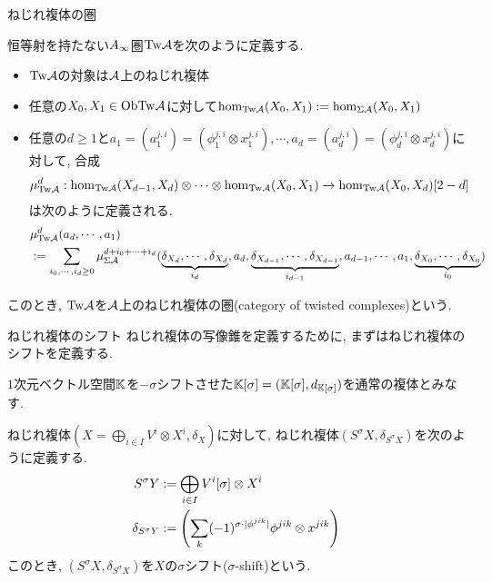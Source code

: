 \documentclass[aspectratio=169, dvipdfmx, 8pt, notheorems, uplatex]{beamer}
\begin{document}
\begin{frame}{ねじれ複体の圏}
  \begin{definition}[ねじれ複体の圏$\Tw\A$]
    恒等射を持たない$A_\infty$圏$\Tw\A$を次のように定義する.
    \begin{itemize}
      \item $\Tw\A$の対象は$\mathcal{A}$上のねじれ複体
      \item 任意の$X_0,X_1 \in \mathrm{Ob}\mathrm{Tw}\mathcal{A}$に対して$\hom_{\mathrm{Tw}\mathcal{A}}(X_0,X_1) : = \hom_{\Sigma\mathcal{A}}(X_0,X_1)$
      \item 任意の$d \geq 1$と$a_1 = (a_1^{j,i}) = (\phi_1^{j,i} \otimes x_1^{j,i}), \cdots, a_d = (a_d^{j,i}) = (\phi_d^{j,i} \otimes x_d^{j,i})$に対して, 合成
      \begin{align*}
        \mu^d_{\mathrm{Tw}\mathcal{A}} : \hom_{\mathrm{Tw}\mathcal{A}}(X_{d-1},X_d) \otimes \cdots \otimes \hom_{\mathrm{Tw}\mathcal{A}}(X_0,X_1) \to \hom_{\mathrm{Tw}\mathcal{A}}(X_0,X_d)[2-d]
      \end{align*}
      は次のように定義される. 
      \begin{align*}
        &\mu^d_{\mathrm{Tw}\mathcal{A}}(a_d,\cdots,a_1) \\
        &:= \sum_{i_0,\cdots,i_d \geq 0} \mu^{d+i_0+\cdots+i_d}_{\Sigma\mathcal{A}} (
        \underbrace{\delta_{X_d},\cdots,\delta_{X_d}}_{i_d}, a_d, 
        \underbrace{\delta_{X_{d-1}},\cdots,\delta_{X_{d-1}}}_{i_{d-1}}, a_{d-1}, 
        \cdots, a_1, 
        \underbrace{\delta_{X_0},\cdots,\delta_{X_0}}_{i_0})
      \end{align*}
    \end{itemize} 
    このとき, $\Tw\A$を$\mathcal{A}$上のねじれ複体の圏(category of twisted complexes)という. 
  \end{definition}
\end{frame}

\begin{frame}{ねじれ複体のシフト}
  ねじれ複体の写像錐を定義するために, まずはねじれ複体のシフトを定義する.

  $1$次元ベクトル空間$\mathbb{K}$を$-\sigma$シフトさせた$\mathbb{K}[\sigma] = (\mathbb{K}[\sigma],d_{\mathbb{K}[\sigma]})$を通常の複体とみなす. 

  \begin{definition}[ねじれ複体のシフト]
    ねじれ複体$(X = \bigoplus_{i \in I} V^i \otimes X^i, \delta_X)$に対して, ねじれ複体$(S^\sigma X,\delta_{S^\sigma X})$を次のように定義する. 
    \begin{align*}
      S^\sigma Y 
      &:= \bigoplus_{i \in I} V^i[\sigma] \otimes X^i \\
      \delta_{S^\sigma Y}
      &:= \qty(\sum_{k} (-1)^{\sigma \cdot |\phi^{jik}|} \phi^{jik} \otimes x^{jik})
    \end{align*}
    このとき, $(S^\sigma X,\delta_{S^\sigma X})$を$X$の$\sigma$シフト($\sigma$-shift)という.
  \end{definition}
\end{frame}
\end{document}
